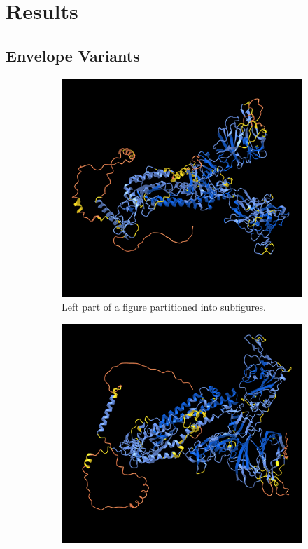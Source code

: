 \chapter{Results}

\section{Envelope Variants}

\begin{figure}[H]
\centering
	\begin{subfigure}[b]{0.45\textwidth}
		\centering
		\includegraphics[width=\textwidth]{figures/gu280_ref.png}
		\caption{Left part of a figure partitioned into subfigures.}
		\label{plddtCon2a}
	\end{subfigure}
	\hfill
	\begin{subfigure}[b]{0.49\textwidth}
		\centering
		\includegraphics[width=\textwidth]{figures/gu280_var3.png}

\end{subfigure}
\end{figure}
